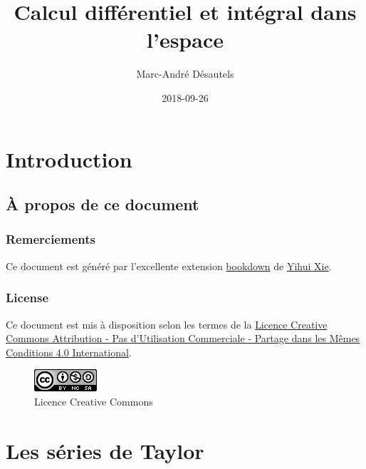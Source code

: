 \documentclass[]{book}
\title{Calcul différentiel et intégral dans l'espace}
\author{Marc-André Désautels}
\date{2018-09-26}
\theoremstyle{definition}
\theoremstyle{definition}
\theoremstyle{definition}
\theoremstyle{remark}
\begin{document}
\maketitle

{
\setcounter{tocdepth}{2}
\tableofcontents
}
\hypertarget{introduction}{%
\chapter*{Introduction}\label{introduction}}

\hypertarget{a-propos-de-ce-document}{%
\section*{À propos de ce document}\label{a-propos-de-ce-document}}

\hypertarget{remerciements}{%
\subsection*{Remerciements}\label{remerciements}}

Ce document est généré par l'excellente extension
\href{https://bookdown.org/}{bookdown} de
\href{https://yihui.name/}{Yihui Xie}.

\hypertarget{license}{%
\subsection*{License}\label{license}}

Ce document est mis à disposition selon les termes de la
\href{http://creativecommons.org/licenses/by-nc-sa/4.0/}{Licence
Creative Commons Attribution - Pas d'Utilisation Commerciale - Partage
dans les Mêmes Conditions 4.0 International}.

\begin{figure}
\centering
\includegraphics{resources/icons/license_cc.png}
\caption{Licence Creative Commons}
\end{figure}

\hypertarget{taylor}{%
\chapter{Les séries de Taylor}\label{taylor}}
\end{document}
